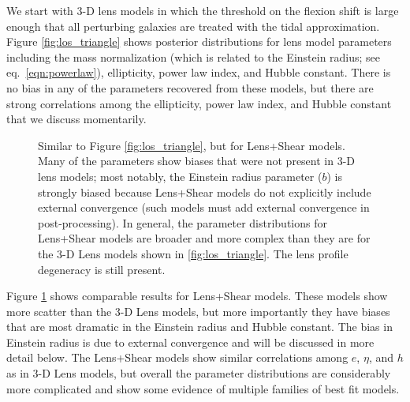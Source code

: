 \documentclass{emulateapj}
\begin{document}
We start with 3-D lens models in which the threshold on the flexion shift is large enough that all perturbing galaxies are treated with the tidal approximation.  Figure \ref{fig:los_triangle} shows posterior distributions for lens model parameters including the mass normalization (which is related to the Einstein radius; see eq.\ \ref{eqn:powerlaw}), ellipticity, power law index, and Hubble constant.  There is no bias in any of the parameters recovered from these models, but there are strong correlations among the ellipticity, power law index, and Hubble constant that we discuss momentarily.

\begin{figure}[t]
\begin{center}
\caption{\label{fig:shear_triangle} Similar to Figure \ref{fig:los_triangle}, but for Lens+Shear models.  Many of the parameters show biases that were not present in 3-D lens models; most notably, the Einstein radius parameter ($b$) is strongly biased because Lens+Shear models do not explicitly include external convergence (such models must add external convergence in post-processing).  In general, the parameter distributions for Lens+Shear models are broader and more complex than they are for the 3-D Lens models shown in \ref{fig:los_triangle}.  The lens profile degeneracy is still present.%
}
\end{center}
\end{figure}

Figure \ref{fig:shear_triangle} shows comparable results for Lens+Shear models.  These models show more scatter than the 3-D Lens models, but more importantly they have biases that are most dramatic in the Einstein radius and Hubble constant.  The bias in Einstein radius is due to external convergence and will be discussed in more detail below.  The Lens+Shear models show similar correlations among $e$, $\eta$, and $h$ as in 3-D Lens models, but overall the parameter distributions are considerably more complicated and show some evidence of multiple families of best fit models.
\end{document}
